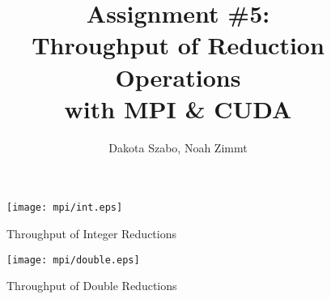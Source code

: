 \documentclass[12pt]{article}
\begin{document}
\author{Dakota Szabo, Noah Zimmt}
\title{ Assignment \#5: \\
	\textbf{
		Throughput of Reduction Operations \\
		with MPI \& CUDA
	}
}
\maketitle

\begin{figure}
	\texttt{[image: mpi/int.eps]}
	\caption{Throughput of Integer Reductions}
\end{figure}

\begin{figure}
	\texttt{[image: mpi/double.eps]}
	\caption{Throughput of Double Reductions}

\end{figure}
\end{document}
